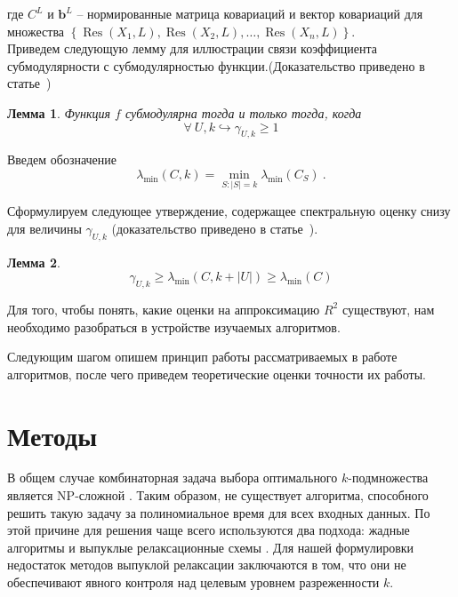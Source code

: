 \documentclass[preprint,12pt]{elsarticle}
\begin{document}
где $C^L$ и $\mathbf{b}^L$ -- нормированные матрица ковариаций и вектор ковариаций для множества $\left\{\operatorname{Res}\left(X_{1}, L\right), \operatorname{Res}\left(X_{2}, L\right), \ldots, \operatorname{Res}\left(X_{n}, L\right)\right\}$.\\

Приведем следующую лемму для иллюстрации связи коэффициента субмодулярности с субмодулярностью функции.(Доказательство приведено в статье~\cite{das2011submodular})
\newtheorem{lemma}{Лемма}
\begin{lemma}
Функция $f$ субмодулярна тогда и только тогда, когда
\[\forall~U, k \hookrightarrow \gamma_{U, k} \geqslant 1\]
\end{lemma}

Введем обозначение 
\[\lambda_{\min }(C, k)=\min _{S:|S|=k} \lambda_{\min }\left(C_{S}\right)~.\]

Сформулируем следующее утверждение, содержащее спектральную оценку снизу для величины $\gamma_{U, k}$ (доказательство приведено в статье~\cite{das2011submodular}).

\begin{lemma}
\[\gamma_{U, k} \geq \lambda_{\min }(C, k+|U|) \geq \lambda_{\min }(C)\]
\end{lemma}


Для того, чтобы понять, какие оценки на аппроксимацию $R^2$ существуют, нам необходимо разобраться в устройстве изучаемых алгоритмов.

Следующим шагом опишем принцип работы рассматриваемых в работе алгоритмов, после чего приведем теоретические оценки точности их работы.

\section{Методы}
\label{S:3}
В общем случае комбинаторная задача выбора оптимального $k$-подмножества является NP-сложной \cite{das2011submodular}. Таким образом, не существует алгоритма, способного решить такую задачу за полиномиальное время для всех входных данных. По этой причине для решения чаще всего используются два подхода: жадные алгоритмы \cite{miller2002subset, tropp2004greed, gilbert2003approximation} и выпуклые релаксационные схемы \cite{obozinski2012convex, tibshirani1996regression, candes2006stable}. Для нашей формулировки недостаток методов выпуклой релаксации заключаются в том, что они не обеспечивают явного контроля над целевым уровнем разреженности $k$.\\
\end{document}
